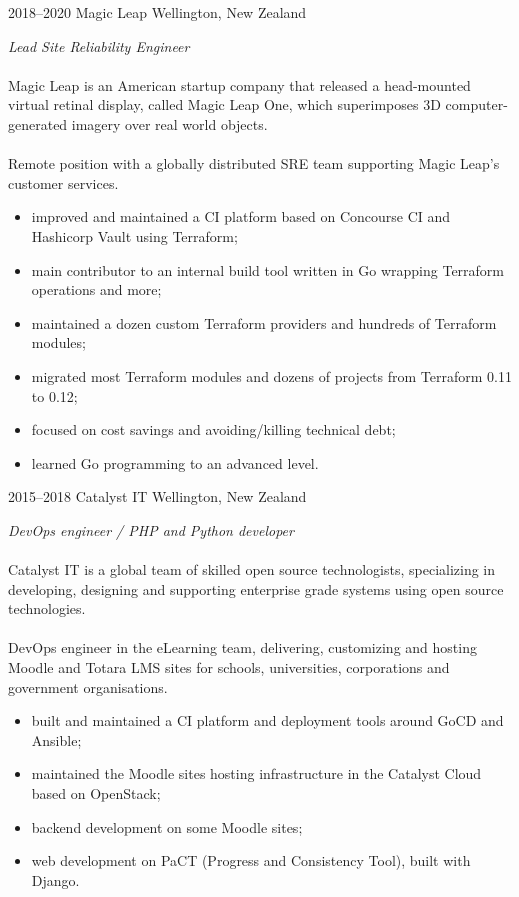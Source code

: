 \documentclass[]{friggeri-cv}
\begin{document}
\begin{entrylist}

  \entry
    {2018--2020}
    {Magic Leap}
    {Wellington, New Zealand}
    {
      \textit{Lead Site Reliability Engineer} \\
      \\
      Magic Leap is an American startup company that released a head-mounted
      virtual retinal display, called Magic Leap One, which superimposes 3D
      computer-generated imagery over real world objects. \\
      \\
      Remote position with a globally distributed SRE team supporting Magic
      Leap's customer services.
      \\
      \begin{itemize}
        \item improved and maintained a CI platform based on Concourse CI and
              Hashicorp Vault using Terraform;
        \item main contributor to an internal build tool written in Go wrapping
              Terraform operations and more;
        \item maintained a dozen custom Terraform providers and hundreds of
              Terraform modules;
        \item migrated most Terraform modules and dozens of projects from
              Terraform 0.11 to 0.12;
        \item focused on cost savings and avoiding/killing technical debt;
        \item learned Go programming to an advanced level.
      \end{itemize}
    }

  \entry
    {2015--2018}
    {Catalyst IT}
    {Wellington, New Zealand}
    {
      \textit{DevOps engineer / PHP and Python developer} \\
      \\
      Catalyst IT is a global team of skilled open source technologists,
      specializing in developing, designing and supporting enterprise grade
      systems using open source technologies. \\
      \\
      DevOps engineer in the eLearning team, delivering,
      customizing and hosting Moodle and Totara LMS sites for schools,
      universities, corporations and government organisations.
      \\
      \begin{itemize}
        \item built and maintained a CI platform and deployment tools around
              GoCD and Ansible;
        \item maintained the Moodle sites hosting infrastructure in the
              Catalyst Cloud based on OpenStack;
        \item backend development on some Moodle sites;
        \item web development on PaCT (Progress and Consistency Tool), built
              with Django.
      \end{itemize}
    }


\end{entrylist}
\end{document}

